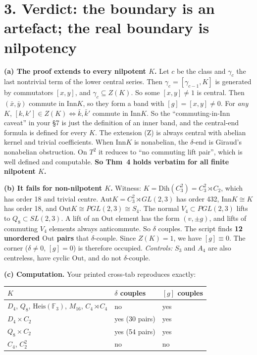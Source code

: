 \documentclass[11pt]{article}
\newcommand{\Inn}{\mathrm{Inn}}
\newcommand{\Out}{\mathrm{Out}}
\newcommand{\Aut}{\mathrm{Aut}}
\begin{document}
\section*{3. Verdict: the boundary is an artefact; the real boundary is nilpotency}
\textbf{(a) The proof extends to every nilpotent $K$.} Let $c$ be the class and $\gamma_c$ the last nontrivial term of the lower central series.
Then $\gamma_c=[\gamma_{c-1},K]$ is generated by commutators $[x,y]$, and $\gamma_c\subseteq Z(K)$. So some $[x,y]\ne1$ is central.
Then $(\bar x,\bar y)$ commute in $\Inn K$, so they form a band with $[g]=[x,y]\ne0$. For \emph{any} $K$,
$[k,k']\in Z(K)\iff\bar k,\bar k'$ commute in $\Inn K$. So the ``commuting-in-Inn caveat'' in your §7 is just the definition of an
inner band, and the central-end formula is defined for every $K$. The extension (Z) is always central with abelian kernel and
trivial coefficients. When $\Inn K$ is nonabelian, the $\delta$-end is Giraud's nonabelian obstruction. On $T^2$ it reduces to
``no commuting lift pair'', which is well defined and computable. \textbf{So Thm~4 holds verbatim for all finite nilpotent $K$.}

\textbf{(b) It fails for non-nilpotent $K$.} Witness: $K=\mathrm{Dih}(C_3^2)=C_3^2\rtimes C_2$, which has order 18 and trivial centre.
$\Aut K=C_3^2\rtimes GL(2,3)$ has order 432, $\Inn K\cong K$ has order 18, and $\Out K\cong PGL(2,3)\cong S_4$. The normal $V_4\subset PGL(2,3)$
lifts to $Q_8\subset SL(2,3)$. A lift of an $\Out$ element has the form $(v,\pm g)$, and lifts of commuting $V_4$ elements always
anticommute. So $\delta$ couples. The script finds \textbf{12 unordered $\Out$ pairs} that $\delta$-couple. Since $Z(K)=1$, we have $[g]\equiv0$.
The corner ($\delta\ne0$, $[g]=0$) is therefore occupied. \emph{Controls:} $S_3$ and $A_4$ are also centreless, have cyclic $\Out$, and do not $\delta$-couple.

\textbf{(c) Computation.} Your printed cross-tab reproduces exactly:

\begin{center}\small
\begin{tabular}{lll}
\toprule
$K$ & $\delta$ couples & $[g]$ couples\\
\midrule
$D_4$, $Q_8$, $\mathrm{Heis}(\mathbb F_3)$, $M_{16}$, $C_4\rtimes C_4$ & no & yes\\
$D_4\times C_2$ & yes (30 pairs) & yes\\
$Q_8\times C_2$ & yes (54 pairs) & yes\\
$C_4$, $C_2^2$ & no & no\\
\bottomrule
\end{tabular}
\end{center}
\end{document}
